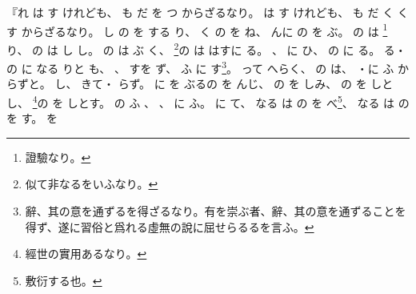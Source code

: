 \documentclass[a4paper,12pt]{article}
\begin{document}
\begin{quoting}
『れ%
は%
す%
けれども、%
も%
だ%
を%
つ%
からざるなり。%
は%
す%
けれども、%
も%
だ%
く%
くす%
からざるなり。%
し%
の%
を%
する%
%
り、%
く%
の%
を%
ね、%
んに%
の%
を%
ぶ。%
の%
は%
\footnote{證驗なり。}%
り、%
の%
は%
し%
し。%
の%
は%
ぶ%
く、%
\footnote{似て非なるをいふなり。}の%
は%
はすに%
る。%
、%
に%
ひ、%
の%
に%
る。%
る・%
の%
に%
なる%
%
りと%
も、%
、%
すを%
ず、%
ふ%
に%
す\footnote{辭、其の意を通ずるを得ざるなり。有を崇ぶ者、辭、其の意を通ずることを得ず、遂に習俗と爲れる虛無の說に屈せらるるを言ふ。}。%
って%
へらく、%
の%
は、%
・に%
ふ%
からずと。%
し、%
きて・%
らず。%
に%
を%
ぶるの%
を%
んじ、%
の%
を%
しみ、%
の%
を%
しとし、%
\footnote{經世の實用あるなり。}の%
を%
しとす。%
の%
ふ%
、%
、%
に%
ふ。%
に%
て、%
なる%
は%
の%
を%
べ\footnote{敷衍する也。}、%
なる%
は%
の%
を%
す。%
を%

\end{quoting}
\end{document}
